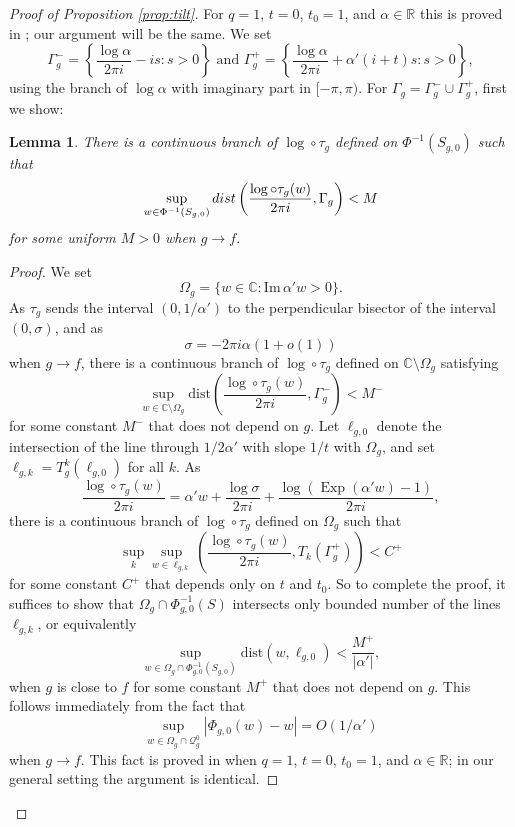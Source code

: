 \documentclass[12pt,letterpaper]{amsart}
\numberwithin{equation}{section}
\newtheorem{lemma}[equation]{Lemma}
\theoremstyle{remark}
\theoremstyle{definition}
\newcommand{\sm}{\setminus}
\newcommand{\C}{\mathbb C}
\newcommand{\R}{\mathbb R}
\newcommand{\QQ}{\mathcal Q}
\DeclareMathOperator{\Exp}{Exp}
\begin{document}
 	\begin{proof}[Proof of Proposition \ref{prop:tilt}]
 		 For $q = 1$, $t=0$, $t_0 = 1$, and $\alpha\in \R$ this is proved in \cite[Lemma 17]{positive_area};
 		our argument will be the same.
 		We set
 		$$\Gamma_g^- = \left\{\frac{\log \alpha}{2\pi i}-is: s>0\right\}\text{ and }\Gamma_g^+ = \left\{\frac{\log \alpha}{2\pi i}+\alpha'(i+t)s: s>0\right\},$$
 		using the branch of $\log\alpha$ with imaginary part in $[-\pi, \pi)$.
 		For $\Gamma_g = \Gamma_g^-\cup \Gamma_g^+$, first we show:
 		\begin{lemma}\label{lem:first log}
 			There is a continuous branch of $\log\circ\tau_g$ defined on $\Phi^{-1}(S_{g, 0})$ such that
 			$$\sup_{w\in \Phi^{-1}(S_{g, 0})}\emph{dist}\left(\frac{\log\circ \tau_g(w)}{2\pi i }, \Gamma_g\right)< {M}$$
 			for some uniform $M>0$ when $g\to f$.
 		\end{lemma}
 		
 		\begin{proof}
 			We  set $$\Omega_g= \{w\in \C:\text{Im}\, \alpha'w>0\}.$$
 			As $\tau_g$ sends the interval $(0, 1/\alpha')$ to the perpendicular bisector of the interval $(0, \sigma)$, and as $$\sigma =-2\pi i\alpha(1+o(1))$$ when $g\to f$, there is a  continuous branch of ${\log\circ \tau_g}$ defined on $\C\sm \Omega_g$ satisfying
 			$$\sup_{w\in \C\sm \Omega_g}\text{dist}\left(\frac{\log\circ \tau_g(w)}{2\pi i}, \Gamma_g^-\right)< M^-$$
 			for some constant $M^-$ that does not depend on $g$.
 			Let $\ell_{g, 0}$ denote the intersection of the line through $1/2\alpha'$ with slope $1/t$ with $\Omega_g$, and set $\ell_{g, k}= T_g^k(\ell_{g, 0})$ for all $k$. 
 			As 
 			$$\frac{\log\circ \tau_g(w)}{2\pi i }=  \alpha'w+\frac{\log \sigma}{2\pi i}+\frac{\log(\Exp(\alpha'w)-1)}{2\pi i},$$
 			there is a continuous branch of $\log\circ \tau_g$ defined on $\Omega_g$ such that
 			$$\sup_k\sup_{w\in \ell_{g, k}}\left(\frac{\log\circ \tau_g(w)}{2\pi i}, T_k(\Gamma_g^+)\right)< C^+$$
 			for some constant $C^+$ that depends only on $t$ and $t_0$. So to complete the proof, it suffices to show that $\Omega_g\cap\Phi_{g, 0}^{-1}(S)$ intersects only bounded number of the lines $\ell_{g, k}$, or equivalently
 			$$\sup_{w\in \Omega_g\cap \Phi_{g, 0}^{-1}(S_{g,0})}\text{dist}(w, \ell_{g,0})< \frac{M^+}{|\alpha'|},$$
 			when $g$ is close to $f$ for some constant $M^+$ that does not depend on $g$.
 			This follows immediately from the fact that 
 			$$\sup_{w\in \Omega_g\cap \QQ_g^0}|\Phi_{g, 0}(w)-w|= O(1/\alpha')$$
 			when $g\to f$. This fact is proved in \cite[Lemma 17]{positive_area} when $q = 1$, $t=0$, $t_0 = 1$, and $\alpha\in \R$;  in our general setting the argument is identical. 
 		\end{proof}
 		

\end{proof}
\end{document}
